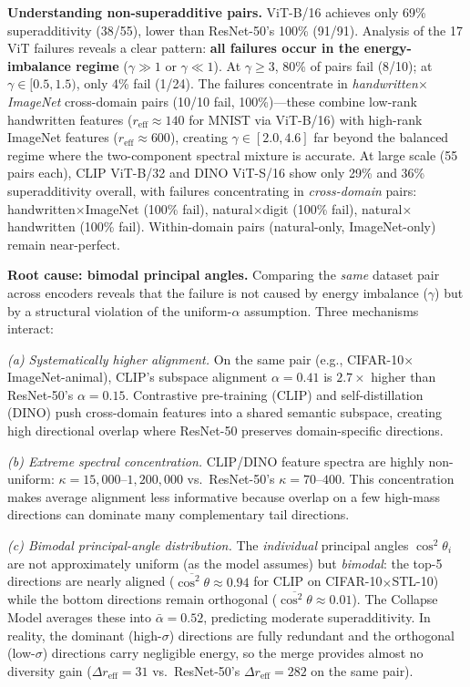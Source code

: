 \documentclass{article}
\newcommand{\reff}{\ensuremath{r_{\mathrm{eff}}}\xspace}
\begin{document}
\textbf{Understanding non-superadditive pairs.}
ViT-B/16 achieves only 69\% superadditivity (38/55), lower than
ResNet-50's 100\% (91/91).
Analysis of the 17 ViT failures reveals a clear pattern:
\textbf{all failures occur in the energy-imbalance regime} ($\gamma\gg1$ or $\gamma\ll1$).
At $\gamma\geq3$, 80\% of pairs fail (8/10);
at $\gamma\in[0.5,1.5)$, only 4\% fail (1/24).
The failures concentrate in \emph{handwritten$\times$ImageNet} cross-domain pairs
(10/10 fail, 100\%)---these combine low-rank handwritten features
($\reff{\approx}140$ for MNIST via ViT-B/16) with high-rank ImageNet features
($\reff{\approx}600$), creating $\gamma\in[2.0,4.6]$ far beyond the
balanced regime where the two-component spectral mixture is accurate.
At large scale (55 pairs each), CLIP ViT-B/32 and DINO ViT-S/16
show only 29\% and 36\% superadditivity overall, with failures
concentrating in \emph{cross-domain} pairs:
handwritten$\times$ImageNet (100\% fail),
natural$\times$digit (100\% fail),
natural$\times$handwritten (100\% fail).
Within-domain pairs (natural-only, ImageNet-only) remain near-perfect.

\textbf{Root cause: bimodal principal angles.}
Comparing the \emph{same} dataset pair across encoders reveals
that the failure is not caused by energy imbalance ($\gamma$)
but by a structural violation of the uniform-$\alpha$ assumption.
Three mechanisms interact:

\emph{(a) Systematically higher alignment.}
On the same pair (e.g., CIFAR-10$\times$ImageNet-animal),
CLIP's subspace alignment $\alpha{=}0.41$ is $2.7\times$
higher than ResNet-50's $\alpha{=}0.15$.
Contrastive pre-training (CLIP) and self-distillation (DINO)
push cross-domain features into a shared semantic subspace,
creating high directional overlap where ResNet-50 preserves
domain-specific directions.

\emph{(b) Extreme spectral concentration.}
CLIP/DINO feature spectra are highly non-uniform:
$\kappa{=}15{,}000$--$1{,}200{,}000$ vs.\ ResNet-50's $\kappa{=}70$--$400$.
This concentration makes average alignment less informative because overlap
on a few high-mass directions can dominate many complementary tail directions.

\emph{(c) Bimodal principal-angle distribution.}
The \emph{individual} principal angles $\cos^2\theta_i$
are not approximately uniform (as the model assumes) but
\emph{bimodal}: the top-5 directions are nearly aligned
($\overline{\cos^2\theta}\approx0.94$ for CLIP on CIFAR-10$\times$STL-10)
while the bottom directions remain orthogonal
($\overline{\cos^2\theta}\approx0.01$).
The Collapse Model averages these into $\bar\alpha{=}0.52$,
predicting moderate superadditivity.
In reality, the dominant (high-$\sigma$) directions are fully redundant
and the orthogonal (low-$\sigma$) directions carry negligible energy,
so the merge provides almost no diversity gain ($\Delta r_{\mathrm{eff}}{=}31$
vs.\ ResNet-50's $\Delta r_{\mathrm{eff}}{=}282$ on the same pair).
\end{document}
